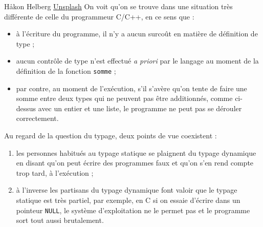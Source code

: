 %
{Håkon Helberg \href{https://unsplash.com/@hakonbrakon?utm_source=unsplash&utm_medium=referral&utm_content=creditCopyText}{Unsplash}}%
On voit qu'on se trouve dans une situation très différente de celle du programmeur C/C++, en ce sens que :
\begin{itemize}
	\item à l'écriture du programme, il n'y a aucun surcoût en matière de définition de type ;
	\item aucun contrôle de type n'est effectué \textit{a priori} par le langage au moment de la définition de la fonction \texttt{somme} ;
	\item par contre, au moment de l'exécution, s'il s'avère qu'on tente de faire une somme entre deux types qui ne peuvent pas être additionnés, comme ci-dessus avec un entier et une liste, le programme ne peut pas se dérouler correctement.
\end{itemize}

Au regard de la question du typage, deux points de vue coexistent :
\begin{enumerate}
	\item  les personnes habitués au typage statique se plaignent du typage dynamique en disant qu'on peut écrire des programmes faux et qu'on s'en rend compte trop tard, à l'exécution ;
	\item à l'inverse les partisans du typage dynamique font valoir que le typage statique est très partiel, par exemple, en C si on essaie d'écrire dans un pointeur \texttt{NULL}, le système d'exploitation ne le permet pas et le programme sort tout aussi brutalement.
\end{enumerate}


